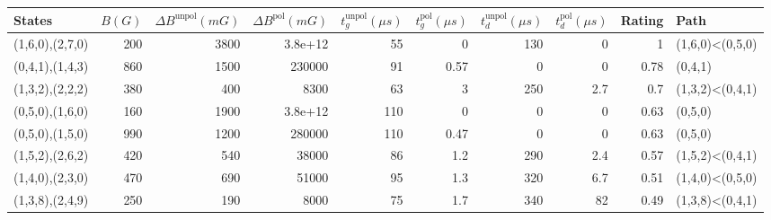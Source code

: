 \begin{tabular}{lrrrrrrrrl}
\hline
 {States}        &   {$B(G)$} &   {$\Delta B^{\text{unpol}}(mG)$} &   {$\Delta B^{\text{pol}}(mG)$} &   {$t^{\text{unpol}}_{g}(\mu s)$} &   {$t^{\text{pol}}_{g}(\mu s)$} &   {$t^{\text{unpol}}_{d}(\mu s)$} &   {$t^{\text{pol}}_{d}(\mu s)$} &   {Rating} & {Path}          \\
\hline
 (1,6,0),(2,7,0) &        200 &                              3800 &                         3.8e+12 &                                55 &                            0    &                               130 &                             0   &       1    & (1,6,0)<(0,5,0) \\
 (0,4,1),(1,4,3) &        860 &                              1500 &                    230000       &                                91 &                            0.57 &                                 0 &                             0   &       0.78 & (0,4,1)         \\
 (1,3,2),(2,2,2) &        380 &                               400 &                      8300       &                                63 &                            3    &                               250 &                             2.7 &       0.7  & (1,3,2)<(0,4,1) \\
 (0,5,0),(1,6,0) &        160 &                              1900 &                         3.8e+12 &                               110 &                            0    &                                 0 &                             0   &       0.63 & (0,5,0)         \\
 (0,5,0),(1,5,0) &        990 &                              1200 &                    280000       &                               110 &                            0.47 &                                 0 &                             0   &       0.63 & (0,5,0)         \\
 (1,5,2),(2,6,2) &        420 &                               540 &                     38000       &                                86 &                            1.2  &                               290 &                             2.4 &       0.57 & (1,5,2)<(0,4,1) \\
 (1,4,0),(2,3,0) &        470 &                               690 &                     51000       &                                95 &                            1.3  &                               320 &                             6.7 &       0.51 & (1,4,0)<(0,5,0) \\
 (1,3,8),(2,4,9) &        250 &                               190 &                      8000       &                                75 &                            1.7  &                               340 &                            82   &       0.49 & (1,3,8)<(0,4,1) \\
\hline
\end{tabular}